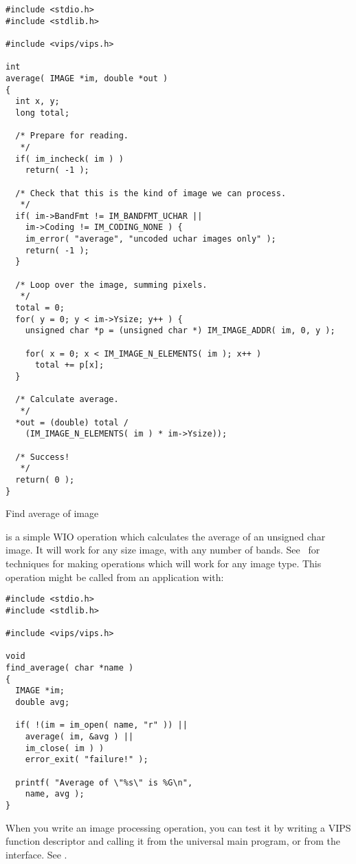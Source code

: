 \begin{fig2}
\begin{verbatim}
#include <stdio.h>
#include <stdlib.h>

#include <vips/vips.h>

int
average( IMAGE *im, double *out )
{
  int x, y;
  long total;

  /* Prepare for reading.
   */
  if( im_incheck( im ) )
    return( -1 );

  /* Check that this is the kind of image we can process.
   */
  if( im->BandFmt != IM_BANDFMT_UCHAR || 
    im->Coding != IM_CODING_NONE ) {
    im_error( "average", "uncoded uchar images only" );
    return( -1 );
  }

  /* Loop over the image, summing pixels.
   */
  total = 0;
  for( y = 0; y < im->Ysize; y++ ) {
    unsigned char *p = (unsigned char *) IM_IMAGE_ADDR( im, 0, y );

    for( x = 0; x < IM_IMAGE_N_ELEMENTS( im ); x++ )
      total += p[x];
  }

  /* Calculate average.
   */
  *out = (double) total / 
    (IM_IMAGE_N_ELEMENTS( im ) * im->Ysize));

  /* Success!
   */
  return( 0 );
}
\end{verbatim}
\caption{Find average of image}
\label{fg:average}
\end{fig2}

 is a simple WIO operation which calculates the
average of an unsigned char image. It will work for any size image, with any
number of bands.  See~ for techniques for making operations
which will work for any image type.  This operation might be called from an
application with:

\begin{verbatim}
#include <stdio.h>
#include <stdlib.h>

#include <vips/vips.h>

void
find_average( char *name )
{
  IMAGE *im;
  double avg;

  if( !(im = im_open( name, "r" )) ||
    average( im, &avg ) ||
    im_close( im ) )
    error_exit( "failure!" );

  printf( "Average of \"%s\" is %G\n", 
    name, avg );
}
\end{verbatim}

\noindent
When you write an image processing operation, you can test it by writing
a VIPS function descriptor and calling it from the \vips{} universal
main program, or from the \nip{} interface. See .

